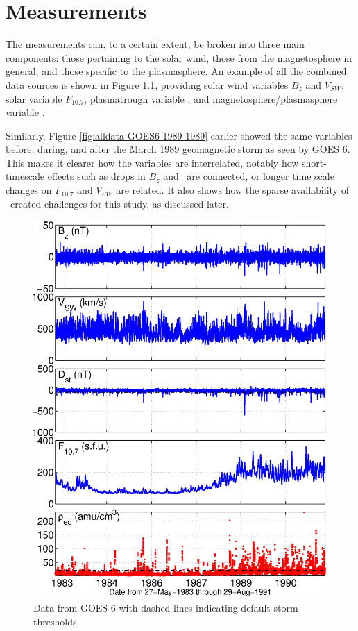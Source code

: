 \chapter[Measurements]{Measurements}


The measurements can, to a certain extent, be broken into three main components: those pertaining to the solar wind, those from the magnetosphere in general, and those specific to the plasmasphere. An example of all the combined data sources is shown in Figure \ref{fig:alldata-GOES6-1983-1991}, providing solar wind variables $B_z$ and $V_{SW}$, solar variable $F_{10.7}$, plasmatrough variable \req, and magnetosphere/plasmasphere variable \dst.

Similarly, Figure \ref{fig:alldata-GOES6-1989-1989} earlier showed the same variables before, during, and after the March 1989 geomagnetic storm as seen by GOES 6. This makes it clearer how the variables are interrelated, notably how short-timescale effects such as drops in $B_z$ and \dst\ are connected, or longer time scale changes on $F_{10.7}$ and $V_{SW}$ are related. It also shows how the sparse availability of \req\ created challenges for this study, as discussed later.

\begin{figure}[htp!]
	\centering
	\includegraphics[width=1\linewidth]{Figures/alldata-GOES6-1983-1991}
	\caption{Data from GOES 6 with dashed lines indicating default storm thresholds}
	\label{fig:alldata-GOES6-1983-1991}
\end{figure}



